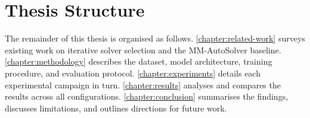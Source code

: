 \section{Thesis Structure}\label{sec:structure}

The remainder of this thesis is organised as follows.
\autoref{chapter:related-work} surveys existing work on iterative solver selection and the MM-AutoSolver baseline.
\autoref{chapter:methodology} describes the dataset, model architecture, training procedure, and evaluation protocol.
\autoref{chapter:experiments} details each experimental campaign in turn.
\autoref{chapter:results} analyses and compares the results across all configurations.
\autoref{chapter:conclusion} summarises the findings, discusses limitations, and outlines directions for future work.
